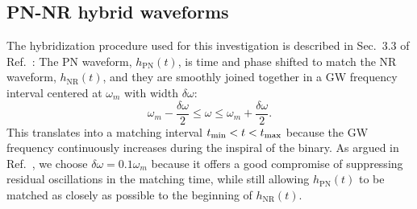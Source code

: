 
 
\subsection{PN-NR hybrid waveforms}\label{s2:NRpNhybridwaveforms}
The hybridization procedure used for this investigation is described in Sec.~3.3 of Ref.~\cite{MacDonald:2011ne}: The PN waveform, $h_\text{PN}(t)$, is time and phase shifted to match the NR waveform, $h_\text{NR}(t)$, and they are smoothly joined together in a GW frequency interval centered at $\omega_m$ with width $\delta\omega$: 
\begin{equation}\label{eq:omega_match}
\omega_m-\frac{\delta\omega}{2} \le \omega \le \omega_m+\frac{\delta\omega}{2}.
\end{equation}
This translates into a matching interval $t_{\rm min}<t<t_{\rm max}$ because the GW frequency continuously increases during the inspiral of the binary. As argued in Ref.~\cite{MacDonald:2011ne}, we
choose $\delta\omega = 0.1\omega_m$ because it offers a good compromise of suppressing residual oscillations in the matching time, while still allowing $h_\text{PN}(t)$ to be matched as closely as possible to the beginning of $h_\text{NR}(t)$.

